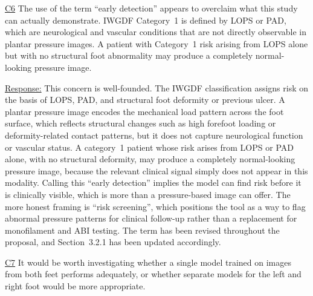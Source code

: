 \documentclass[12pt,a4paper]{article}
\newcommand{\cid}[1]{{\color{cidred}\underline{#1}}}
\newcommand{\mref}[1]{%
  \marginnote{%
    \color{respblue}\scriptsize
    \rule[-0.3ex]{0.6pt}{1.4ex}\hspace{4pt}%
    \parbox[t]{2.4cm}{\raggedright #1}%
  }%
}
\newenvironment{response}{%
  \par\color{respblue}%
}{\par}
\begin{document}
\cid{C6} The use of the term ``early detection'' appears to overclaim what this study can actually demonstrate. IWGDF Category~1 is defined by LOPS or PAD, which are neurological and vascular conditions that are not directly observable in plantar pressure images. A patient with Category~1 risk arising from LOPS alone but with no structural foot abnormality may produce a completely normal-looking pressure image.

\mref{\S~3.2.1\\Classification\\Labels}
\begin{response}
\underline{Response:} This concern is well-founded. The IWGDF classification assigns risk on the basis of LOPS, PAD, and structural foot deformity or previous ulcer. A plantar pressure image encodes the mechanical load pattern across the foot surface, which reflects structural changes such as high forefoot loading or deformity-related contact patterns, but it does not capture neurological function or vascular status. A category~1 patient whose risk arises from LOPS or PAD alone, with no structural deformity, may produce a completely normal-looking pressure image, because the relevant clinical signal simply does not appear in this modality. Calling this ``early detection'' implies the model can find risk before it is clinically visible, which is more than a pressure-based image can offer. The more honest framing is ``risk screening'', which positions the tool as a way to flag abnormal pressure patterns for clinical follow-up rather than a replacement for monofilament and ABI testing. The term has been revised throughout the proposal, and Section~3.2.1 has been updated accordingly.
\end{response}

\cid{C7} It would be worth investigating whether a single model trained on images from both feet performs adequately, or whether separate models for the left and right foot would be more appropriate.
\end{document}

